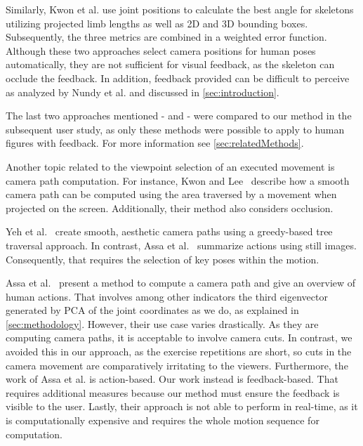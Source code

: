 Similarly, Kwon et al. \cite{kwon2020ocp} use joint positions to calculate the best angle for skeletons utilizing projected limb lengths as well as 2D and 3D bounding boxes. Subsequently, the three metrics are combined in a weighted error function. Although these two approaches select camera positions for human poses automatically, they are not sufficient for visual feedback, as the skeleton can occlude the feedback. In addition, feedback provided can be difficult to perceive as analyzed by Nundy et al. \cite{nundy2000wam} and discussed in \autoref{sec:introduction}.

The last two approaches mentioned -\cite{ishara2015mra} and \cite{kwon2020ocp} - were compared to our method in the subsequent user study, as only these methods were possible to apply to human figures with feedback. For more information see \autoref{sec:relatedMethods}.

Another topic related to the viewpoint selection of an executed movement is camera path computation. For instance, Kwon and Lee~\cite{kwon2008dcp} describe how a smooth camera path can be computed using the area traversed by a movement when projected on the screen. Additionally, their method also considers occlusion.

Yeh et al.~\cite{yeh2011ecp} create smooth, aesthetic camera paths using a greedy-based tree traversal approach. In contrast, Assa et al.~\cite{assa2005asp} summarize actions using still images. Consequently, that requires the selection of key poses within the motion.

Assa et al.~\cite{assa2008moh} present a method to compute a camera path and give an overview of human actions. That involves among other indicators the third eigenvector generated by PCA of the joint coordinates as we do, as explained in \autoref{sec:methodology}. However, their use case varies drastically. As they are computing camera paths, it is acceptable to involve camera cuts. In contrast, we avoided this in our approach, as the exercise repetitions are short, so cuts in the camera movement are comparatively irritating to the viewers. Furthermore, the work of Assa et al. is action-based. Our work instead is feedback-based. That requires additional measures because our method must ensure the feedback is visible to the user. Lastly, their approach is not able to perform in real-time, as it is computationally expensive and requires the whole motion sequence for computation.

